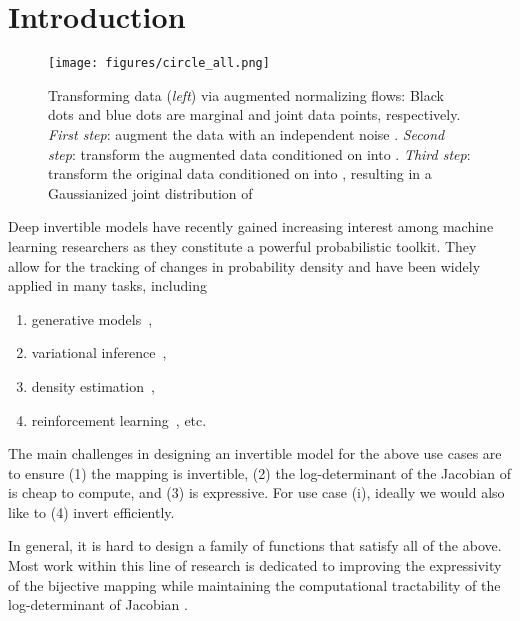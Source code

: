 \documentclass{article}
\begin{document}
\section{Introduction}
\begin{figure*}
    \centering
    \texttt{[image: figures/circle\_all.png]}
    \vspace{-0.7cm}
    \caption{\small 
    Transforming data  (\emph{left}) via augmented normalizing flows:
    Black dots and blue dots are marginal and joint data points, respectively.
    \emph{First step}: augment the data  with an independent noise .
    \emph{Second step}: transform the augmented data  conditioned on  into . 
    \emph{Third step}: transform the original data  conditioned on  into , resulting in a Gaussianized joint distribution of }
    \label{fig:2d_vis}
\end{figure*}
Deep invertible models have recently gained increasing interest among machine learning researchers as they constitute a powerful probabilistic toolkit. 
They allow for the tracking of  changes in probability density and have been widely applied in many tasks, including
\begin{enumerate}[label=(\roman*)]
    \item generative models~\citep{dinh2016density, kingma2018glow, chen2019residualflows},
    \item variational inference~\citep{rezende2015variational,kingma2016improved,berg2018sylvester},
    \item density estimation~\citep{papamakarios2017masked,huang2018neural},
    \item reinforcement learning~\citep{mazoure2019leveraging,ward2019improving}, etc. 
\end{enumerate} 

The main challenges in designing an invertible model for the above use cases are
to ensure (1) the mapping  is invertible, (2) the log-determinant of the Jacobian of  is cheap to compute, and (3)  is expressive. 
For use case (i), ideally we would also like to (4) invert  efficiently. 

In general, it is hard to design a family of functions that satisfy all of the above. 
Most work within this line of research is dedicated to improving the expressivity of the bijective mapping while maintaining the computational tractability of the log-determinant of Jacobian \citep{dinh2016density, kingma2016improved, huang2018neural, chen2019residualflows}. 
\end{document}
